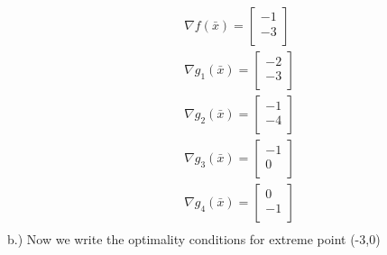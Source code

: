 \documentclass[12pt]{article}
\begin{document}
    \begin{align*}
        &\nabla f(\bar x) = 
            \begin{bmatrix}
                -1\\
                -3\\
            \end{bmatrix}\\
        &\nabla g_1(\bar x) = 
            \begin{bmatrix}
                -2\\
                -3\\
            \end{bmatrix}\\
        &\nabla g_2(\bar x) = 
            \begin{bmatrix}
                -1\\
                -4\\
            \end{bmatrix}\\
        &\nabla g_3(\bar x) = 
            \begin{bmatrix}
                -1\\
                0\\
            \end{bmatrix}\\
        &\nabla g_4(\bar x) = 
            \begin{bmatrix}
                0\\
                -1\\
            \end{bmatrix}\\
    \end{align*}
    b.) Now we write the optimality conditions for extreme point (-3,0)\\
\end{document}
